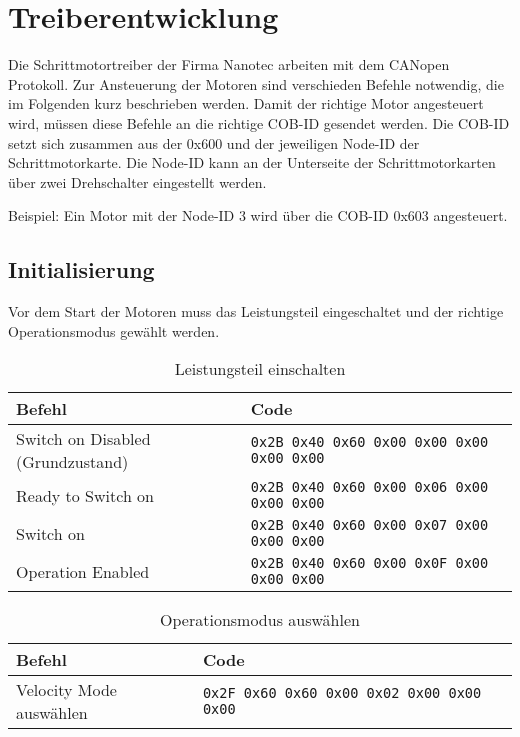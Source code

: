 

\section{Treiberentwicklung}
\label{sec:Treiber}

Die Schrittmotortreiber der Firma Nanotec arbeiten mit dem CANopen Protokoll. Zur Ansteuerung der Motoren sind verschieden Befehle notwendig, die im Folgenden kurz beschrieben werden. Damit der richtige Motor angesteuert wird, müssen diese Befehle an die richtige COB-ID gesendet werden. Die COB-ID setzt sich zusammen aus der 0x600 und der jeweiligen Node-ID der Schrittmotorkarte. Die Node-ID kann an der Unterseite der Schrittmotorkarten über zwei Drehschalter eingestellt werden. 

Beispiel: 
Ein Motor mit der Node-ID 3 wird über die COB-ID 0x603 angesteuert.


\subsection{Initialisierung}

Vor dem Start der Motoren muss das Leistungsteil eingeschaltet und der richtige Operationsmodus gewählt werden. 
\begin{table}[H]
    \begin{tabularx}{\textwidth}{@{}Xl@{}} \toprule
    
 
    Befehl & Code \\
    \midrule
    
    Switch on Disabled (Grundzustand)  &
    \lstinline{0x2B 0x40 0x60 0x00 0x00 0x00 0x00 0x00} \\

    Ready to Switch on  &
    \lstinline{0x2B 0x40 0x60 0x00 0x06 0x00 0x00 0x00} \\

   Switch on  &
    \lstinline{0x2B 0x40 0x60 0x00 0x07 0x00 0x00 0x00} \\
    
    Operation Enabled  &
    \lstinline{0x2B 0x40 0x60 0x00 0x0F 0x00 0x00 0x00} \\

    \bottomrule
    \end{tabularx}
    \caption{Leistungsteil einschalten}
\end{table}


\begin{table}[H]
    \begin{tabularx}{\textwidth}{@{}Xl@{}} \toprule
    
 
    Befehl & Code \\
    \midrule
    
    Velocity Mode auswählen &
    \lstinline{0x2F 0x60 0x60 0x00 0x02 0x00 0x00 0x00} \\

    \bottomrule
    \end{tabularx}
    \caption{Operationsmodus auswählen}
\end{table}



